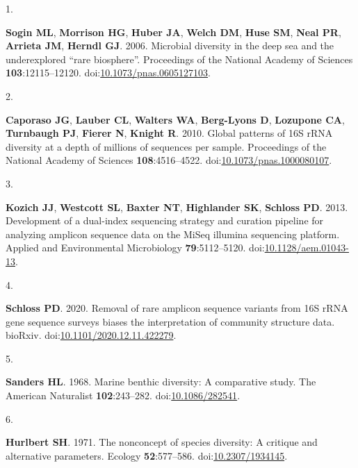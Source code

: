 \documentclass[
]{article}
\newlength{\cslhangindent}
\newlength{\csllabelwidth}
\newlength{\cslentryspacingunit} %
\newenvironment{CSLReferences}[2] %
 {%
  \setlength{\parindent}{0pt}
  \ifodd #1
  \let\oldpar\par
  \def\par{\hangindent=\cslhangindent\oldpar}
  \fi
  \setlength{\parskip}{#2\cslentryspacingunit}
 }%
 {}
\newcommand{\CSLLeftMargin}[1]{\parbox[t]{\csllabelwidth}{#1}}
\newcommand{\CSLRightInline}[1]{\parbox[t]{\linewidth - \csllabelwidth}{#1}\break}
\begin{document}
\hypertarget{refs}{}
\begin{CSLReferences}{0}{1}
\leavevmode{}%
\CSLLeftMargin{1. }%
\CSLRightInline{\textbf{Sogin ML}, \textbf{Morrison HG}, \textbf{Huber
JA}, \textbf{Welch DM}, \textbf{Huse SM}, \textbf{Neal PR},
\textbf{Arrieta JM}, \textbf{Herndl GJ}. 2006. Microbial diversity in
the deep sea and the underexplored {``}rare biosphere{''}. Proceedings
of the National Academy of Sciences \textbf{103}:12115--12120.
doi:\href{https://doi.org/10.1073/pnas.0605127103}{10.1073/pnas.0605127103}.}

\leavevmode{}%
\CSLLeftMargin{2. }%
\CSLRightInline{\textbf{Caporaso JG}, \textbf{Lauber CL},
\textbf{Walters WA}, \textbf{Berg-Lyons D}, \textbf{Lozupone CA},
\textbf{Turnbaugh PJ}, \textbf{Fierer N}, \textbf{Knight R}. 2010.
Global patterns of 16S {rRNA} diversity at a depth of millions of
sequences per sample. Proceedings of the National Academy of Sciences
\textbf{108}:4516--4522.
doi:\href{https://doi.org/10.1073/pnas.1000080107}{10.1073/pnas.1000080107}.}

\leavevmode{}%
\CSLLeftMargin{3. }%
\CSLRightInline{\textbf{Kozich JJ}, \textbf{Westcott SL}, \textbf{Baxter
NT}, \textbf{Highlander SK}, \textbf{Schloss PD}. 2013. Development of a
dual-index sequencing strategy and curation pipeline for analyzing
amplicon sequence data on the {MiSeq} illumina sequencing platform.
Applied and Environmental Microbiology \textbf{79}:5112--5120.
doi:\href{https://doi.org/10.1128/aem.01043-13}{10.1128/aem.01043-13}.}

\leavevmode{}%
\CSLLeftMargin{4. }%
\CSLRightInline{\textbf{Schloss PD}. 2020. Removal of rare amplicon
sequence variants from 16S {rRNA} gene sequence surveys biases the
interpretation of community structure data. bio{R}xiv.
doi:\href{https://doi.org/10.1101/2020.12.11.422279}{10.1101/2020.12.11.422279}.}

\leavevmode{}%
\CSLLeftMargin{5. }%
\CSLRightInline{\textbf{Sanders HL}. 1968. Marine benthic diversity: A
comparative study. The American Naturalist \textbf{102}:243--282.
doi:\href{https://doi.org/10.1086/282541}{10.1086/282541}.}

\leavevmode{}%
\CSLLeftMargin{6. }%
\CSLRightInline{\textbf{Hurlbert SH}. 1971. The nonconcept of species
diversity: A critique and alternative parameters. Ecology
\textbf{52}:577--586.
doi:\href{https://doi.org/10.2307/1934145}{10.2307/1934145}.}


\end{CSLReferences}
\end{document}

